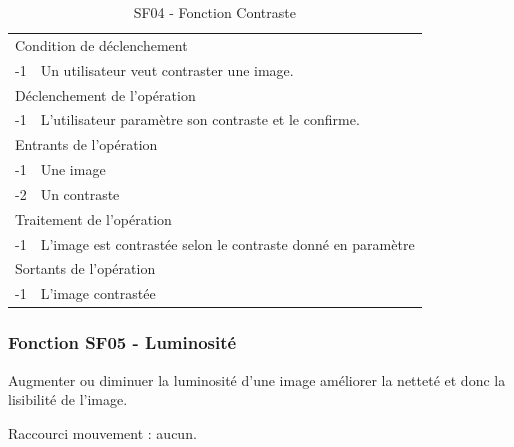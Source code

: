 \documentclass[a4paper]{article}
\begin{document}
\begin{table}[H]
  \centering
   \small
	\begin{tabular}{|c|p{12cm}|}
   		\hline
   			\rowcolor{lightgray}\multicolumn{2}{|c|}{\textbf{SF04 - Fonction Contraste}} \\
   		\hline
   			\multicolumn{2}{|l|}{Condition de d\'eclenchement} \\
   		\hline
   			-1 & Un utilisateur veut contraster une image. \\
   		\hline
   			\multicolumn{2}{|l|}{D\'eclenchement de l'op\'eration} \\
   		\hline
   			-1 & L'utilisateur paramètre son contraste et le confirme. \\
   		\hline
   			\multicolumn{2}{|l|}{Entrants de l'op\'eration} \\
   		\hline
        	-1 & Une image \\
   			-2 & Un contraste \\ 	
        \hline
   			\multicolumn{2}{|l|}{Traitement de l'op\'eration} \\
  		\hline
   			-1 & L'image est contrastée selon le contraste donné en paramètre \\
   		\hline
   			\multicolumn{2}{|l|}{Sortants de l'op\'eration} \\
   		\hline
   			-1 & L'image contrastée \\
   		\hline
	\end{tabular}
  \caption{SF04 - Fonction Contraste}
  \normalsize
  \label{tab:visu_img_contraste}
\end{table}



\subsubsection{Fonction SF05 - Luminosité}


Augmenter ou diminuer la luminosité d'une image améliorer la netteté et donc la lisibilité de l'image.

Raccourci mouvement : aucun.
\end{document}
